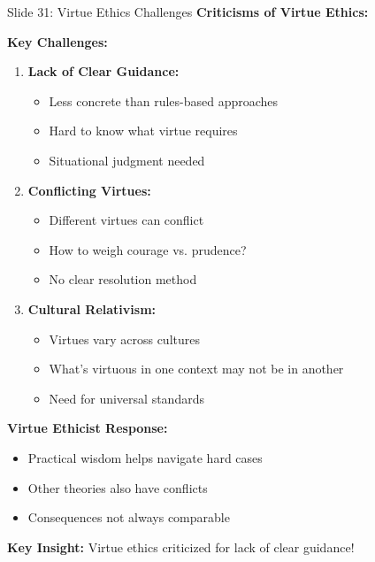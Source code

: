 \documentclass[8pt]{beamer}
\begin{document}
	\begin{frame}{Slide 31: Virtue Ethics Challenges}
		\fontsize{6.5}{7.5}\selectfont
		\textbf{Criticisms of Virtue Ethics:}
		
		\vspace{0.1cm}
		\textbf{Key Challenges:}
		\begin{enumerate}
			\item \textbf{Lack of Clear Guidance:}
			\begin{itemize}
				\item Less concrete than rules-based approaches
				\item Hard to know what virtue requires
				\item Situational judgment needed
			\end{itemize}
			\item \textbf{Conflicting Virtues:}
			\begin{itemize}
				\item Different virtues can conflict
				\item How to weigh courage vs. prudence?
				\item No clear resolution method
			\end{itemize}
			\item \textbf{Cultural Relativism:}
			\begin{itemize}
				\item Virtues vary across cultures
				\item What's virtuous in one context may not be in another
				\item Need for universal standards
			\end{itemize}
		\end{enumerate}
		
		\vspace{0.1cm}
		\textbf{Virtue Ethicist Response:}
		\begin{itemize}
			\item Practical wisdom helps navigate hard cases
			\item Other theories also have conflicts
			\item Consequences not always comparable
		\end{itemize}
		
		\textcolor{myblue}{\textbf{Key Insight:}} Virtue ethics criticized for \textcolor{myblue}{lack of clear guidance}!
	\end{frame}
	
\end{document}
